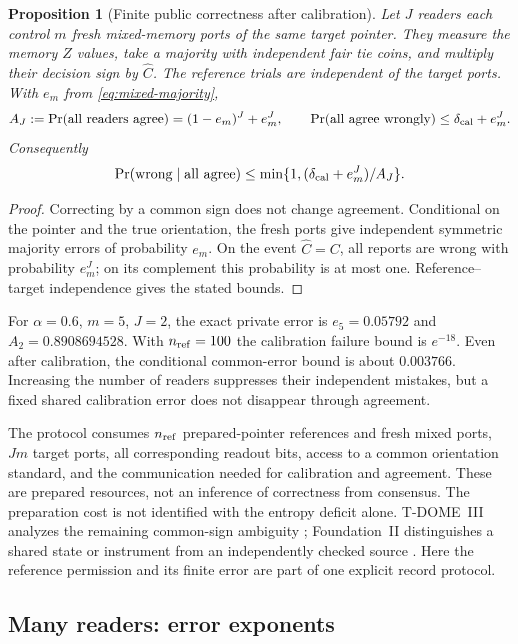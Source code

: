 \documentclass[12pt,a4paper]{article}
\newtheorem{proposition}[theorem]{Proposition}
\begin{document}
\begin{proposition}[Finite public correctness after calibration]
\label{prop:calibrated-public}
Let $J$ readers each control $m$ fresh mixed-memory ports of the
same target pointer. They measure the memory $Z$ values, take a
majority with independent fair tie coins, and multiply their
decision sign by $\widehat C$. The reference trials are independent
of the target ports. With $e_m$ from \eqref{eq:mixed-majority},
\begin{equation}\label{eq:calibrated-public}
 A_J:=\Pr(\text{all readers agree})=(1-e_m)^J+e_m^J,\qquad
 \Pr(\text{all agree wrongly})\le\delta_{\rm cal}+e_m^J .
\end{equation}
Consequently
\[
 \Pr(\text{wrong}\mid\text{all agree})
 \le\min\{1,(\delta_{\rm cal}+e_m^J)/A_J\}.
\]
\end{proposition}
\begin{proof}
Correcting by a common sign does not change agreement. Conditional
on the pointer and the true orientation, the fresh ports give
independent symmetric majority errors of probability $e_m$.
On the event $\widehat C=C$, all reports are wrong with probability
$e_m^J$; on its complement this probability is at most one.
Reference--target independence gives the stated bounds.
\end{proof}

For $\alpha=0.6$, $m=5$, $J=2$, the exact private error is
$e_5=0.05792$ and $A_2=0.8908694528$.
With $n_{\rm ref}=100$ the calibration failure bound is $e^{-18}$.
Even after calibration, the conditional common-error bound is
about $0.003766$. Increasing the number of readers suppresses
their independent mistakes, but a fixed shared calibration error
does not disappear through agreement.

The protocol consumes $n_{\rm ref}$ prepared-pointer references
and fresh mixed ports, $Jm$ target ports, all corresponding readout
bits, access to a common orientation standard, and the communication
needed for calibration and agreement. These are prepared resources,
not an inference of correctness from consensus. The preparation
cost is not identified with the entropy deficit alone.
T-DOME~III analyzes the remaining common-sign ambiguity
\cite{Liu2026TDOME_III}; Foundation~II distinguishes a shared
state or instrument from an independently checked source
\cite{FoundationII}. Here the reference permission and its finite
error are part of one explicit record protocol.

\subsection{Many readers: error exponents}
\end{document}

